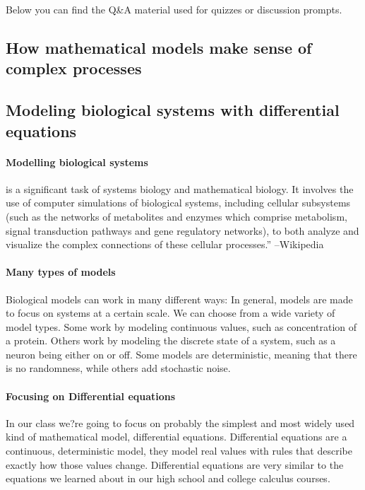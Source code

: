 Below you can find the Q\&A material used for quizzes or discussion prompts.


\subsection{How mathematical models make sense of complex processes}

% 


\subsection{Modeling biological systems with differential equations}
\paragraph{Modelling biological systems} is a significant task of systems biology and mathematical biology. It involves the use of computer simulations of biological systems, including cellular subsystems (such as the networks of metabolites and enzymes which comprise metabolism, signal transduction pathways and gene regulatory networks), to both analyze and visualize the complex connections of these cellular processes.'' --Wikipedia

\paragraph{Many types of models} Biological models can work in many different ways:  In general, models are made to focus on systems at a certain scale.  We can choose from a wide variety of model types. Some work by modeling continuous values, such as concentration of a protein.  Others work by modeling the discrete state of a system, such as a neuron being either on or off.  Some models are deterministic, meaning that there is no randomness, while others add stochastic noise.

\paragraph{Focusing on Differential equations} In our class we?re going to focus on probably the simplest and most widely used kind of mathematical model, differential equations.  Differential equations are a continuous, deterministic model, they model real values with rules that describe exactly how those values change.  Differential equations are very similar to the equations we learned about in our high school and college calculus courses.

